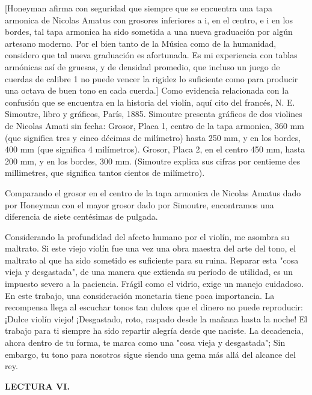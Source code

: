 \documentclass[12pt]{book}
\begin{document}
[Honeyman afirma con seguridad que siempre que se encuentra una tapa armonica de Nicolas Amatus con grosores inferiores a i, en el centro, e i en los bordes, tal tapa armonica ha sido sometida a una nueva graduación por algún artesano moderno. Por el bien tanto de la Música como de la humanidad, considero que tal nueva graduación es afortunada. Es mi experiencia con tablas armónicas así de gruesas, y de densidad promedio, que incluso un juego de cuerdas de calibre 1 no puede vencer la rigidez lo suficiente como para producir una octava de buen tono en cada cuerda.] Como evidencia relacionada con la confusión que se encuentra en la historia del violín, aquí cito del francés, N. E. Simoutre, libro y gráficos, París, 1885. Simoutre presenta gráficos de dos violines de Nicolas Amati sin fecha: Grosor, Placa 1, centro de la tapa armonica, 360 mm (que significa tres y cinco décimas de milímetro) hasta 250 mm, y en los bordes, 400 mm (que significa 4 milímetros). Grosor, Placa 2, en el centro 450 mm, hasta 200 mm, y en los bordes, 300 mm. (Simoutre explica sus cifras por centieme des millimetres, que significa tantos cientos de milímetro).

Comparando el grosor en el centro de la tapa armonica de Nicolas Amatus dado por Honeyman con el mayor grosor dado por Simoutre, encontramos una diferencia de siete centésimas de pulgada.

Considerando la profundidad del afecto humano por el violín, me asombra su maltrato. Si este viejo violín fue una vez una obra maestra del arte del tono, el maltrato al que ha sido sometido es suficiente para su ruina. Reparar esta "cosa vieja y desgastada", de una manera que extienda su período de utilidad, es un impuesto severo a la paciencia. Frágil como el vidrio, exige un manejo cuidadoso. En este trabajo, una consideración monetaria tiene poca importancia. La recompensa llega al escuchar tonos tan dulces que el dinero no puede reproducir: ¡Dulce violín viejo! ¡Desgastado, roto, raspado desde la mañana hasta la noche! El trabajo para ti siempre ha sido repartir alegría desde que naciste. La decadencia, ahora dentro de tu forma, te marca como una "cosa vieja y desgastada"; Sin embargo, tu tono para nosotros sigue siendo una gema más allá del alcance del rey.

\textbf{LECTURA VI.}
\end{document}
